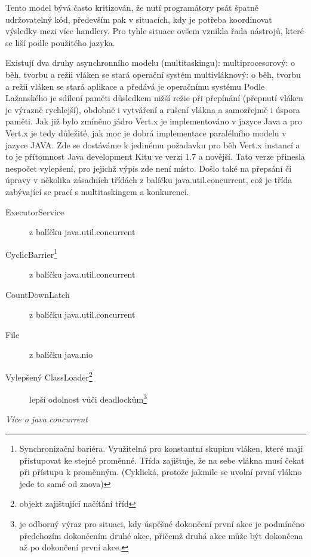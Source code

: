 Tento model bývá často kritizován, že nutí programátory psát špatně udržovatelný kód, především pak v situacích, kdy je potřeba koordinovat výsledky mezi více handlery. Pro tyhle situace ovšem vznikla řada nástrojů, které se liší podle použitého jazyka.

Existují dva druhy asynchronního modelu (multitaskingu):
multiprocesorový: o běh, tvorbu a režii vláken se stará operační systém
multivláknový: o běh, tvorbu a režii vláken se stará aplikace a předává je operačnímu systému
Podle Lažanského\cite{vlaknaCvut} je sdílení paměti důsledkem nižší režie při přepínání (přepnutí vláken je výrazně rychlejší), obdobně i vytváření a rušení vlákna a samozřejmě i úspora paměti.
Jak již bylo zmíněno jádro Vert.x je implementováno v jazyce Java a pro Vert.x je tedy důležité, jak moc je dobrá implementace paralélního modelu v jazyce JAVA. Zde se dostáváme k jedinému požadavku pro běh Vert.x instancí a to je přítomnost Java development Kitu ve verzi 1.7 a novější. Tato verze přinesla nespočet vylepšení, pro jejichž výpis zde není místo. Došlo také na přepsání či úpravy v několika zásadních třídách z balíčku java.util.concurrent, což je třída zabývající se prací s multitaskingem a konkurencí.
\begin{description}
\item[ExecutorService]{z balíčku java.util.concurrent}
\item[CyclicBarrier\footnote{Synchronizační bariéra. Využitelná pro konstantní skupinu vláken, které mají přistupovat ke stejné proměnné. Třída zajištuje, že na sebe vlákna musí čekat při přístupu k proměnným. (Cyklická, protože jakmile se uvolní první vlákno jede to samé od znova)}]{z balíčku java.util.concurrent}
\item[CountDownLatch]{z balíčku java.util.concurrent}
\item[File]{z balíčku java.nio}
\item[Vylepšený ClassLoader\footnote{objekt zajištující načítání tříd}]{lepší odolnost vůči deadlockům\footnote{ je odborný výraz pro situaci, kdy úspěšné dokončení první akce je podmíněno předchozím dokončením druhé akce, přičemž druhá akce může být dokončena až po dokončení první akce.}}
\end{description}
\emph{Více o java.concurrent\cite{javaChangelog}}

